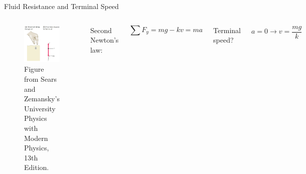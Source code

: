 \documentclass[]{beamer}
\begin{document}
 \begin{frame}
  Fluid Resistance and Terminal Speed
 \vspace{3mm}



 \begin{columns}[c]
  \column{2in}  %
 

  \begin{figure}[h!]  
    \includegraphics[width=1.\textwidth]{images/f24.jpg}
    \caption{ {\tiny Figure from Sears and Zemansky's University Physics 
    with Modern Physics, 13th Edition.} }
  \end{figure}

  \column{2in}

Second Newton's law:
\vspace{3mm}


\begin{equation}
  \sum F_y=mg-kv=ma
\end{equation}
\pause

Terminal speed?

\pause
\begin{equation*}
a=0\rightarrow v=\frac{mg}{k}
\end{equation*}

  \end{columns}


   \end{frame}
\end{document}
